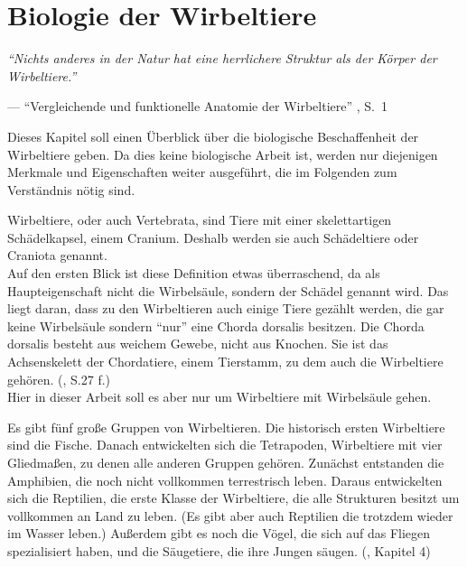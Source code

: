 \chapter{Biologie der Wirbeltiere}
\label{chapter:biology}

\begin{center}
 \begin{minipage}{12cm}
  \emph{"`Nichts anderes in der Natur hat eine herrlichere Struktur als der Körper der Wirbeltiere."'}
 
  --- "`Vergleichende und funktionelle Anatomie der Wirbeltiere"' \cite{Vergleichende_Anatomie}, S.\ 1
 \end{minipage}
\end{center}

Dieses Kapitel soll einen Überblick über die biologische Beschaffenheit der Wirbeltiere geben. Da dies keine biologische Arbeit ist, werden nur diejenigen Merkmale und Eigenschaften weiter ausgeführt, die im Folgenden zum Verständnis nötig sind.

Wirbeltiere, oder auch Vertebrata, sind Tiere mit einer skelettartigen Schädelkapsel, einem Cranium. Deshalb werden sie auch Schädeltiere oder Craniota genannt.\\
Auf den ersten Blick ist diese Definition etwas überraschend, da als  Haupteigenschaft nicht die Wirbelsäule, sondern der Schädel genannt wird. Das liegt daran, dass zu den Wirbeltieren auch einige Tiere gezählt werden, die gar keine Wirbelsäule sondern "`nur"' eine Chorda dorsalis besitzen. Die Chorda dorsalis besteht aus weichem Gewebe, nicht aus Knochen. Sie ist das Achsenskelett der Chordatiere, einem Tierstamm, zu dem auch die Wirbeltiere gehören. (\cite{Vergleichende_Anatomie}, S.27 f.)\\
Hier in dieser Arbeit soll es aber nur um Wirbeltiere mit Wirbelsäule gehen.

Es gibt fünf große Gruppen von Wirbeltieren. Die historisch ersten Wirbeltiere sind die Fische. Danach entwickelten sich die Tetrapoden, Wirbeltiere mit vier Gliedmaßen, zu denen alle anderen Gruppen gehören. Zunächst entstanden die Amphibien, die noch nicht vollkommen terrestrisch leben. Daraus entwickelten sich die Reptilien, die erste Klasse der Wirbeltiere, die alle Strukturen besitzt um vollkommen an Land zu leben. (Es gibt aber auch Reptilien die trotzdem wieder im Wasser leben.) Außerdem gibt es noch die Vögel, die sich auf das Fliegen spezialisiert haben, und die Säugetiere, die ihre Jungen säugen. (\cite{Vergleichende_Anatomie}, Kapitel 4)

